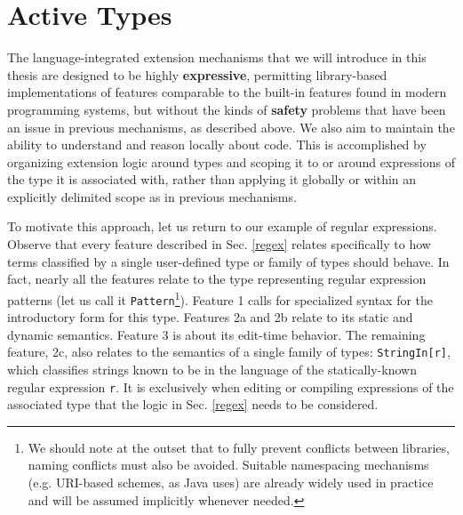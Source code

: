 \section{Active Types}\label{contributions}
The language-integrated extension mechanisms that we will introduce in this thesis are designed to be highly \textbf{expressive}, permitting library-based implementations of features comparable to the built-in features found in modern programming systems, but without the kinds of \textbf{safety} problems that have been an issue in previous mechanisms, as described above. We also aim to maintain the ability to understand and reason locally about code. This is accomplished by organizing extension logic around types and scoping it to or around expressions of the type it is associated with, rather than applying it globally or within an explicitly delimited scope as in previous mechanisms. 

To motivate this approach, let us return to our example of regular expressions. Observe that every feature described in Sec. \ref{regex} relates specifically to how terms  classified by a single user-defined type or family of types should behave. In fact, nearly all the features relate to the type representing regular expression patterns (let us call it \verb|Pattern|\footnote{We should note at the outset that to fully prevent conflicts between libraries, naming conflicts must also be avoided. Suitable namespacing mechanisms (e.g. URI-based schemes, as Java uses) are already widely used in practice  and will be assumed implicitly whenever needed.}). Feature 1 calls for specialized syntax for the introductory form for this type. Features 2a and 2b relate to its static and dynamic semantics. Feature 3 is about its edit-time behavior. The remaining feature, 2c, also relates to the semantics of a single family of types: \verb|StringIn[r]|, which classifies strings known to be in the language of the statically-known regular expression \verb|r|. It is exclusively when editing or compiling expressions of the associated type that the logic in Sec. \ref{regex}  needs to be considered. 

